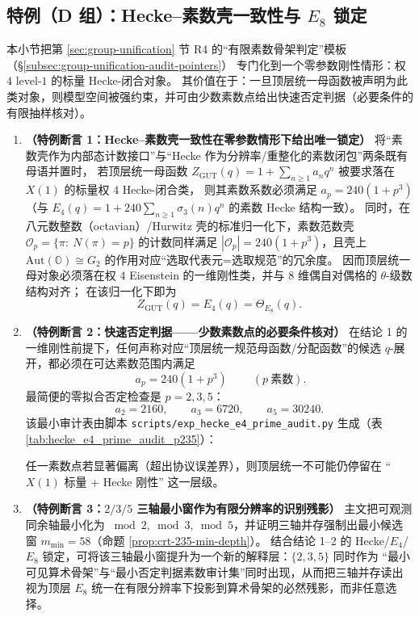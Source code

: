 \subsection{特例（D 组）：Hecke--素数壳一致性与 \texorpdfstring{$E_8$}{E8} 锁定}\label{subsubsec:bridgepack-e8-hecke-lock}
本小节把第 \ref{sec:group-unification} 节 R4 的“有限素数骨架判定”模板（\S\ref{subsec:group-unification-audit-pointers}）
专门化到一个零参数刚性情形：权 \(4\) level-\(1\) 的标量 Hecke-闭合对象。
其价值在于：一旦顶层统一母函数被声明为此类对象，则模型空间被强约束，并可由少数素数点给出快速否定判据（必要条件的有限抽样核对）。
\begin{enumerate}
  \item \textbf{（特例断言 1：Hecke--素数壳一致性在零参数情形下给出唯一锁定）}
  将“素数壳作为内部态计数接口”与“Hecke 作为分辨率/重整化的素数闭包”两条既有母语并置时，
  若顶层统一母函数 \(Z_{\mathrm{GUT}}(q)=1+\sum_{n\ge 1}a_n q^n\) 被要求落在 \(X(1)\) 的标量权 \(4\) Hecke-闭合类，
  则其素数系数必须满足
  \(
  a_p=240(1+p^3)
  \)
  （与 \(E_4(q)=1+240\sum_{n\ge 1}\sigma_3(n)q^n\) 的素数 Hecke 结构一致）。
  同时，在八元数整数（octavian）/Hurwitz 壳的标准归一化下，素数范数壳
  \(\mathcal{O}_p=\{\pi:\ N(\pi)=p\}\)
  的计数同样满足 \(|\mathcal{O}_p|=240(1+p^3)\)，且壳上 \(\mathrm{Aut}(\mathbb{O})\cong G_2\) 的作用对应“选取代表元=选取规范”的冗余度。
  因而顶层统一母对象必须落在权 \(4\) Eisenstein 的一维刚性类，并与 \(8\) 维偶自对偶格的 \(\theta\)-级数结构对齐；
  在该归一化下即为
  \[
  Z_{\mathrm{GUT}}(q)=E_4(q)=\Theta_{E_8}(q).
  \]

  \item \textbf{（特例断言 2：快速否定判据——少数素数点的必要条件核对）}
  在结论 1 的一维刚性前提下，任何声称对应“顶层统一规范母函数/分配函数”的候选 \(q\)-展开，都必须在可达素数范围内满足
  \[
  \boxed{\ a_p=240(1+p^3)\ }\qquad(p\ \text{素数}).
  \]
  最简便的零拟合否定检查是 \(p=2,3,5\)：
  \[
  a_2=2160,\qquad a_3=6720,\qquad a_5=30240.
  \]
  该最小审计表由脚本 \texttt{scripts/exp\_hecke\_e4\_prime\_audit.py} 生成（表 \ref{tab:hecke_e4_prime_audit_p235}）：
  
  任一素数点若显著偏离（超出协议误差界），则顶层统一不可能仍停留在 “\(X(1)\) 标量 + Hecke 刚性” 这一层级。

  \item \textbf{（特例断言 3：\texorpdfstring{$2/3/5$}{2/3/5} 三轴最小窗作为有限分辨率的识别残影）}
  主文把可观测同余轴最小化为 \(\bmod 2,\bmod 3,\bmod 5\)，并证明三轴并存强制出最小候选窗 \(m_{\min}=58\)（命题 \ref{prop:crt-235-min-depth}）。
  结合结论 1--2 的 Hecke/\(E_4\)/\(E_8\) 锁定，可将该三轴最小窗提升为一个新的解释层：\(\{2,3,5\}\) 同时作为
  “最小可见算术骨架”与“最小否定判据素数审计集”同时出现，从而把三轴并存读出视为顶层 \(E_8\) 统一在有限分辨率下投影到算术骨架的必然残影，而非任意选择。


\end{enumerate}
